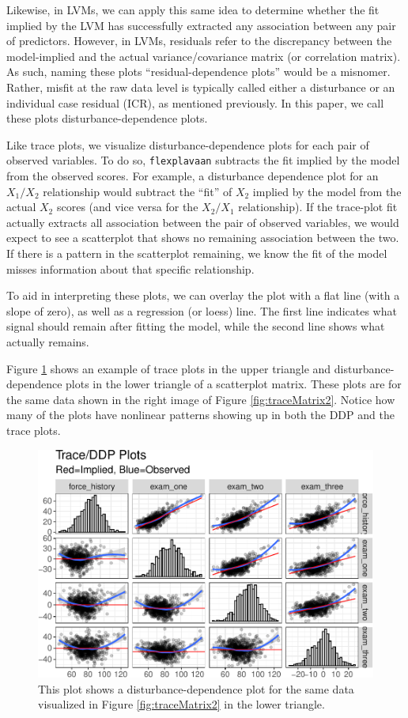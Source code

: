 \documentclass[
  english,
  doc]{apa6}
\begin{document}
Likewise, in LVMs, we can apply this same idea to determine whether the fit implied by the LVM has successfully extracted any association between any pair of predictors. However, in LVMs, residuals refer to the discrepancy between the model-implied and the actual variance/covariance matrix (or correlation matrix). As such, naming these plots ``residual-dependence plots'' would be a misnomer. Rather, misfit at the raw data level is typically called either a disturbance or an individual case residual (ICR), as mentioned previously. In this paper, we call these plots disturbance-dependence plots.

Like trace plots, we visualize disturbance-dependence plots for each pair of observed variables. To do so, \texttt{flexplavaan} subtracts the fit implied by the model from the observed scores. For example, a disturbance dependence plot for an \(X_1/X_2\) relationship would subtract the ``fit'' of \(X_2\) implied by the model from the actual \(X_2\) scores (and vice versa for the \(X_2/X_1\) relationship). If the trace-plot fit actually extracts all association between the pair of observed variables, we would expect to see a scatterplot that shows no remaining association between the two. If there is a pattern in the scatterplot remaining, we know the fit of the model misses information about that specific relationship.

To aid in interpreting these plots, we can overlay the plot with a flat line (with a slope of zero), as well as a regression (or loess) line. The first line indicates what signal should remain after fitting the model, while the second line shows what actually remains.

Figure \ref{fig:ddp} shows an example of trace plots in the upper triangle and disturbance-dependence plots in the lower triangle of a scatterplot matrix. These plots are for the same data shown in the right image of Figure \ref{fig:traceMatrix2}. Notice how many of the plots have nonlinear patterns showing up in both the DDP and the trace plots.



\begin{figure}
\centering
\includegraphics{flexplavaan_draft_files/figure-latex/ddp-1.pdf}
\caption{\label{fig:ddp}This plot shows a disturbance-dependence plot for the same data visualized in Figure \ref{fig:traceMatrix2} in the lower triangle.}
\end{figure}
\end{document}
